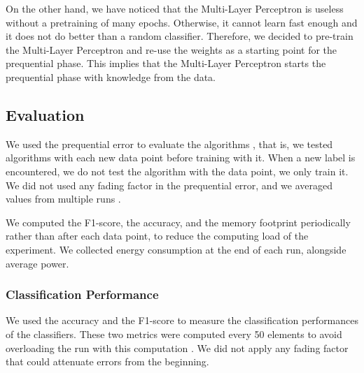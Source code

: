 On the other hand, we have noticed that the
Multi-Layer Perceptron is useless without a
pretraining of many epochs. Otherwise, it cannot
learn fast enough and it does not do better than a
random classifier. Therefore, we decided to
pre-train the Multi-Layer Perceptron and re-use
the weights as a starting point for the
prequential phase. This implies that the
Multi-Layer Perceptron starts the prequential
phase with knowledge from the data.

\subsection{Evaluation}
We used the prequential error to evaluate the algorithms , that is, we tested
algorithms with each new data point before training with it. When a
new label is encountered, we do  not test the algorithm with the data point, we
only train it. We did not used any fading factor in the prequential error, and we averaged
values from multiple runs .

We computed the F1-score, the accuracy, and the memory footprint periodically
rather than after each data point, to reduce the computing load of the experiment.
We collected energy consumption at the end of each run, alongside average power.


\subsubsection{Classification Performance}
We used the accuracy and the F1-score to measure the classification
performances of the classifiers. These two metrics
were computed every 50
elements to avoid overloading the run with this computation . We
did not apply any fading factor that could attenuate errors from the
beginning.


